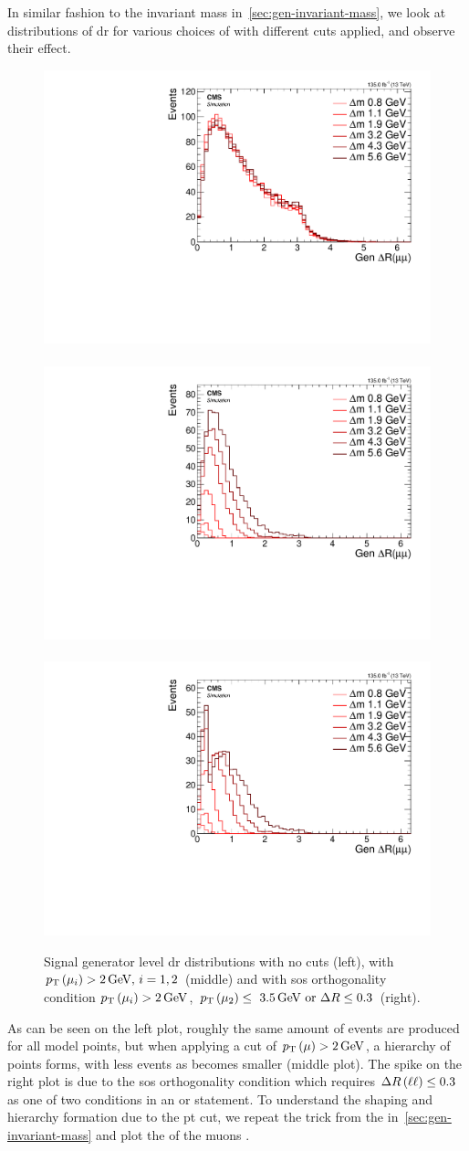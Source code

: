In similar fashion to the invariant mass in~\ref{sec:gen-invariant-mass}, we look at distributions of \gls{dr} for various choices of \dm with different cuts applied, and observe their effect.

\begin{figure}[h]
\centering
\includegraphics[width=0.32\linewidth]{plots/signal_muons_gen/none_gen_deltaR.pdf} \,
\includegraphics[width=0.32\linewidth]{plots/signal_muons_gen/none_gen_deltaR_cut.pdf}  \,
\includegraphics[width=0.32\linewidth]{plots/signal_muons_gen/none_gen_deltaR_orth.pdf} \\
\caption[Signal generator level \DR distributions]{ Signal generator level \gls{dr} distributions with no cuts (left), with $p_{\mathrm{T}}\left(\mu_i\right)>2\,\text{Ge\hspace{-.08em}V},\,i=1,2$ (middle) and with \gls{sos} orthogonality condition $p_{\mathrm{T}}\left(\mu_i\right)>2\,\text{Ge\hspace{-.08em}V}$, $p_{\mathrm{T}}\left(\mu_2\right)\leq~3.5\,\text{Ge\hspace{-.08em}V}\text{ or }\Delta R\leq 0.3$ (right).}
\label{fig:signal-generator-dr}
\end{figure}

As can be seen on the left plot, roughly the same amount of events are produced for all \dm model points, but when applying a cut of $p_{\mathrm{T}}\left(\mu\right)>2\,\text{Ge\hspace{-.08em}V}$, a hierarchy of \dm points forms, with less events as \dm becomes smaller (middle plot). The spike on the right plot is due to the \gls{sos} orthogonality condition which requires $\Delta R\left(\ell\ell\right)\leq 0.3$ as one of two conditions in an or statement.
To understand the shaping and hierarchy formation due to the \gls{pt} cut, we repeat the trick from the \mmumu in~\ref{sec:gen-invariant-mass} and plot the \pt of the muons \vs \drll.

